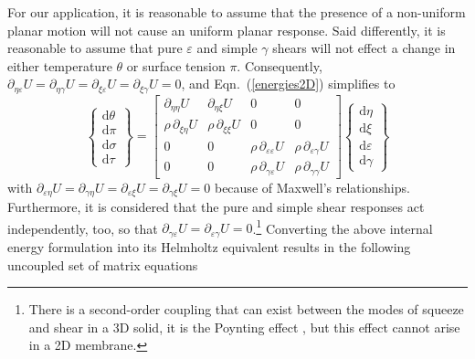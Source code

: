 For our application, it is reasonable to assume that the presence of a non-uniform planar motion will not cause an uniform planar response.  Said differently, it is reasonable to assume that pure $\varepsilon$ and simple $\gamma$ shears will not effect a change in either temperature $\theta$ or surface tension $\pi$.  Consequently, $\partial_{\eta\varepsilon} U = \partial_{\eta\gamma} U = \partial_{\xi\varepsilon} U = \partial_{\xi\gamma} U = 0$, and Eqn.~(\ref{energies2D}) simplifies to
\begin{displaymath}
\left\{ \begin{matrix}
\mathrm{d} \theta \\ \mathrm{d} \pi \\
\mathrm{d} \sigma \\ \mathrm{d} \tau
\end{matrix} \right\} = \begin{bmatrix}
\partial_{\eta\eta} U & 
\partial_{\eta\xi} U & 
0 & 0 \\ 
\rho \, \partial_{\xi\eta} U & 
\rho \, \partial_{\xi\xi} U & 
0 & 0 \\
0 & 0 & 
\rho \, \partial_{\varepsilon\varepsilon} U & 
\rho \, \partial_{\varepsilon\gamma} U \\
0 & 0 & 
\rho \, \partial_{\gamma\varepsilon} U & 
\rho \, \partial_{\gamma\gamma} U 
\end{bmatrix} 
\left\{ \begin{matrix}
\mathrm{d}\eta \\ \mathrm{d} \xi \\
\mathrm{d} \varepsilon \\ \mathrm{d} \gamma
\end{matrix} \right\} 
\end{displaymath}
with $\partial_{\varepsilon\eta} U = \partial_{\gamma\eta} U = \partial_{\varepsilon\xi} U = \partial_{\gamma\xi} U = 0$ because of Maxwell's relationships.  Furthermore, it is considered that the pure and simple shear responses act independently, too, so that $\partial_{\gamma\varepsilon} U = \partial_{\varepsilon\gamma} U = 0$.\footnote{
    There is a second-order coupling that can exist between the modes of squeeze and shear in a 3D solid, it is the Poynting effect \cite{FreedZamani19}, but this effect cannot arise in a 2D membrane.
}
Converting the above internal energy formulation into its Helmholtz equivalent results in the following uncoupled set of matrix equations
